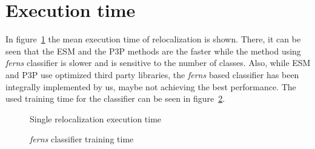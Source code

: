 \section{Execution time}
\label{sec:execution_time}

In figure~\ref{fig:exec_time} the mean execution time of relocalization is shown. There, it can be seen that the ESM and the P3P methods are the faster while the method using \textit{ferns} classifier is slower and is sensitive to the number of classes. Also, while ESM and P3P use optimized third party libraries, the \textit{ferns} based classifier has been integrally implemented by us, maybe not achieving the best performance. The used training time for the classifier can be seen in figure~\ref{fig:training_time}.\\

\begin{figure}[htpb]
  \centering
  \begin{bchart}[steps={0.2,0.4,0.6,0.8,1},max=1]
  \end{bchart}
  \caption{Single relocalization execution time}
  \label{fig:exec_time}
\end{figure}


\begin{figure}[htpb]
  \centering
  \begin{bchart}[step=10, max=70]
  \end{bchart}
  \caption{\textit{ferns} classifier training time}
  \label{fig:training_time}
\end{figure}
